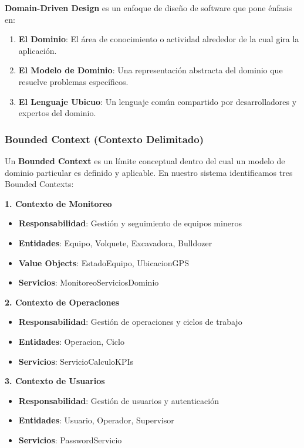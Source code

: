 \documentclass[12pt,a4paper]{article}
\begin{document}
\textbf{Domain-Driven Design} es un enfoque de diseño de software que pone énfasis en:

\begin{enumerate}[leftmargin=*]
    \item \textbf{El Dominio}: El área de conocimiento o actividad alrededor de la cual gira la aplicación.
    \item \textbf{El Modelo de Dominio}: Una representación abstracta del dominio que resuelve problemas específicos.
    \item \textbf{El Lenguaje Ubicuo}: Un lenguaje común compartido por desarrolladores y expertos del dominio.
\end{enumerate}

\subsubsection{Bounded Context (Contexto Delimitado)}

Un \textbf{Bounded Context} es un límite conceptual dentro del cual un modelo de dominio particular es definido y aplicable. En nuestro sistema identificamos tres Bounded Contexts:

\textbf{1. Contexto de Monitoreo}
\begin{itemize}
    \item \textbf{Responsabilidad}: Gestión y seguimiento de equipos mineros
    \item \textbf{Entidades}: Equipo, Volquete, Excavadora, Bulldozer
    \item \textbf{Value Objects}: EstadoEquipo, UbicacionGPS
    \item \textbf{Servicios}: MonitoreoServiciosDominio
\end{itemize}

\textbf{2. Contexto de Operaciones}
\begin{itemize}
    \item \textbf{Responsabilidad}: Gestión de operaciones y ciclos de trabajo
    \item \textbf{Entidades}: Operacion, Ciclo
    \item \textbf{Servicios}: ServicioCalculoKPIs
\end{itemize}

\textbf{3. Contexto de Usuarios}
\begin{itemize}
    \item \textbf{Responsabilidad}: Gestión de usuarios y autenticación
    \item \textbf{Entidades}: Usuario, Operador, Supervisor
    \item \textbf{Servicios}: PasswordServicio
\end{itemize}
\end{document}
